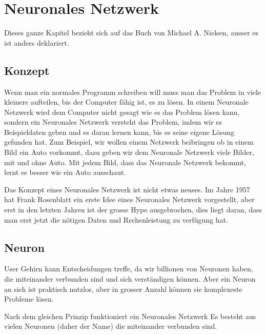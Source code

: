 \documentclass[12pt,a4paper]{report}
\begin{document}
\chapter{Neuronales Netzwerk}
\label{ch:neuronalesNetzwerk}
Dieses ganze Kapitel bezieht sich auf das Buch von Michael A. Nielsen\cite{neuralbook}, ausser es ist anders deklariert.
\section{Konzept}\label{sec:konzept}
Wenn man ein normales Programm schreiben will muss man das Problem in viele kleinere aufteilen, bis der Computer fähig ist,
es zu lösen.
In einem Neuronale Netzwerk wird dem Computer nicht gesagt wie es das Problem lösen kann, sondern ein Neuronales Netzwerk
versteht das Problem, indem wir es Beispieldaten geben und es daran lernen kann, bis es seine eigene Lösung gefunden hat.
Zum Beispiel, wir wollen einem Netzwerk beibringen ob in einem Bild ein Auto vorkommt,
dazu geben wir dem Neuronale Netzwerk viele Bilder, mit und ohne Auto.
Mit jedem Bild, dass das Neuronale Netzwerk bekommt, lernt es besser wie ein Auto ausschaut.

Das Konzept eines Neuronales Netzwerk ist nicht etwas neuses.
Im Jahre 1957 hat Frank Rosenblatt ein erste Idee eines Neuronales Netzwerk vorgestellt, aber erst in den letzten
Jahren ist der grosse Hype ausgebrochen, dies liegt daran, dass man erst jetzt die nötigen Daten
und Rechenleistung zu verfügung hat.

\section{Neuron}\label{sec:neuron}
User Gehirn kann Entscheidungen treffe, da wir billionen von Neuronen haben, die miteinander verbunden sind und sich
verständigen können.
Aber ein Neuron an sich ist praktisch nutzlos, aber in grosser Anzahl können sie komplexeste Probleme lösen.

Nach dem gleichen Prinzip funktioniert ein Neuronales Netzwerk
Es besteht aus vielen Neuronen (daher der Name) die miteinander verbunden sind.
\end{document}
